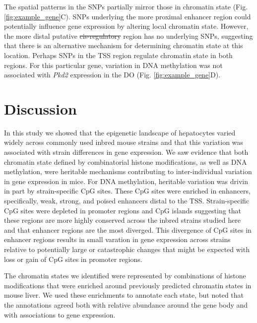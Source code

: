 \documentclass[
  11pt,
]{article}
\providecommand{\DIFaddtex}[1]{{\protect\color{blue}\uwave{#1}}} %
\providecommand{\DIFdeltex}[1]{{\protect\color{red}\sout{#1}}}                      %
\providecommand{\DIFaddbegin}{} %
\providecommand{\DIFaddend}{} %
\providecommand{\DIFdelbegin}{} %
\providecommand{\DIFdelend}{} %
\providecommand{\DIFadd}[1]{\texorpdfstring{\DIFaddtex{#1}}{#1}} %
\providecommand{\DIFdel}[1]{\texorpdfstring{\DIFdeltex{#1}}{}} %
\newcommand{\DIFscaledelfig}{0.5}
\newlength{\DIFdelgraphicswidth} %
\newlength{\DIFdelgraphicsheight} %
\newcommand{\DIFaddincludegraphics}[2][]{{\color{blue}\fbox{\DIFOincludegraphics[#1]{#2}}}} %
\newcommand{\DIFdelincludegraphics}[2][]{%
\sbox{\DIFdelgraphicsbox}{\DIFOincludegraphics[#1]{#2}}%
\settoboxwidth{\DIFdelgraphicswidth}{\DIFdelgraphicsbox} %
\settoboxtotalheight{\DIFdelgraphicsheight}{\DIFdelgraphicsbox} %
\scalebox{\DIFscaledelfig}{%
\parbox[b]{\DIFdelgraphicswidth}{\usebox{\DIFdelgraphicsbox}\\[-\baselineskip] \rule{\DIFdelgraphicswidth}{0em}}\llap{\resizebox{\DIFdelgraphicswidth}{\DIFdelgraphicsheight}{%
\setlength{\unitlength}{\DIFdelgraphicswidth}%
\begin{picture}(1,1)%
\thicklines\linethickness{2pt} %
{\color[rgb]{1,0,0}\put(0,0){\framebox(1,1){}}}%
{\color[rgb]{1,0,0}\put(0,0){\line( 1,1){1}}}%
{\color[rgb]{1,0,0}\put(0,1){\line(1,-1){1}}}%
\end{picture}%
}\hspace*{3pt}}} %
} %
\DeclareRobustCommand{\DIFaddbegin}{\DIFOaddbegin \let\includegraphics\DIFaddincludegraphics} %
\DeclareRobustCommand{\DIFaddend}{\DIFOaddend \let\includegraphics\DIFOincludegraphics} %
\DeclareRobustCommand{\DIFdelbegin}{\DIFOdelbegin \let\includegraphics\DIFdelincludegraphics} %
\DeclareRobustCommand{\DIFdelend}{\DIFOaddend \let\includegraphics\DIFOincludegraphics} %
\begin{document}
The spatial patterns in the SNPs partially mirror those in chromatin
state (Fig. \ref{fig:example_gene}C). SNPs underlying the more proximal
enhancer region could potentially influence gene expression by altering
local chromatin state. However, the more distal putative
\DIFdelbegin \DIFdel{cis-regulatory
}\DIFdelend \DIFaddbegin \textit{\DIFadd{cis}}\DIFadd{-regulatory }\DIFaddend region has no underlying SNPs, suggesting that
there is an alternative mechanism for determining chromatin state at
this location. Perhaps SNPs in the TSS region regulate chromatin state
in both regions. For this particular gene, variation in DNA methylation
was not associated with \textit{Pkd2} expression in the DO (Fig.
\ref{fig:example_gene}D).

\hypertarget{discussion}{%
\section{Discussion}\label{discussion}}

In this study we showed that the epigenetic landscape of hepatocytes
varied widely across commonly used inbred mouse strains and that this
variation was associated with strain differences in gene expression. We
saw evidence that both chromatin state defined by combinatorial histone
modifications, as well as DNA methylation, were heritable mechanisms
contributing to inter-individual variation in gene expression in mice.
For DNA methylation, heritable variation was drivin in part by
strain-specific CpG sites. These CpG sites were enriched in enhancers,
specifically, weak, strong, and poised enhancers distal to the TSS.
Strain-specific CpG sites were depleted in promoter regions and CpG
islands suggesting that these regions are more highly conserved across
the inbred strains studied here and that enhancer regions are the most
diverged. This divergence of CpG sites in enhancer regions results in
small varation in gene expression across strains relative to potentially
large or catastrophic changes that might be expected with loss or gain
of CpG sites in promoter regions.

The chromatin states we identified were represented by combinations of
histone modifications that were enriched around previously predicted
chromatin states in mouse liver. We used these enrichments to annotate
each state, but noted that the annotations agreed both with relative
abundance around the gene body and with associations to gene expression.
\end{document}
